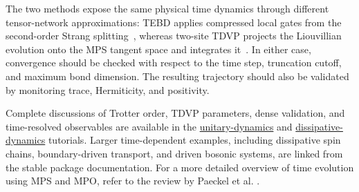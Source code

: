 The two methods expose the same physical time dynamics through different tensor-network approximations: TEBD applies compressed local gates from the second-order Strang splitting~\cite{Strang1968,Suzuki1976}, whereas two-site TDVP projects the Liouvillian evolution onto the MPS tangent space and integrates it~\cite{Haegeman2011,Haegeman2016,Lubich2015}.
In either case, convergence should be checked with respect to the time step, truncation cutoff, and maximum bond dimension.
The resulting trajectory should also be validated by monitoring trace, Hermiticity, and positivity.

Complete discussions of Trotter order, TDVP parameters, dense validation, and time-resolved observables are available in the \href{https://gauthameshwar.github.io/ProcessTensors.jl/stable/tutorials/unitary_dynamics/}{unitary-dynamics} and \href{https://gauthameshwar.github.io/ProcessTensors.jl/stable/tutorials/dissipative_dynamics/}{dissipative-dynamics} tutorials.
Larger time-dependent examples, including dissipative spin chains, boundary-driven transport, and driven bosonic systems, are linked from the stable package documentation.
For a more detailed overview of time evolution using MPS and MPO, refer to the review by Paeckel et al. \cite{Paeckel2019}.
